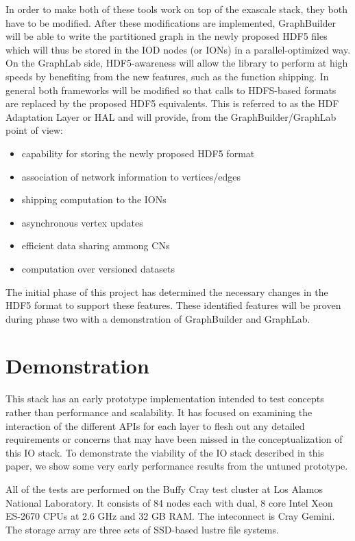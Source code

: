 \documentclass[conference]{IEEEtran}
\begin{document}
In order to make both of these tools work on top of the exascale stack, they
both have to be modified. After these modifications are implemented,
GraphBuilder will be able to write the partitioned graph in the newly proposed
HDF5 files which will thus be stored in the IOD nodes (or IONs) in a
parallel-optimized way. On the GraphLab side, HDF5-awareness will allow
the library to perform at high speeds by benefiting from the new
features, such as the function shipping. In general both frameworks will be
modified so that calls to HDFS-based formats are replaced by the proposed HDF5
equivalents. This is referred to as the HDF Adaptation Layer or HAL and will
provide, from the GraphBuilder/GraphLab point of view:

\begin{itemize}
\itemsep1pt\parskip0pt
\item
  capability for storing the newly proposed HDF5 format
\item
  association of network information to vertices/edges
\item
  shipping computation to the IONs
\item
  asynchronous vertex updates
\item
  efficient data sharing ammong CNs
\item
  computation over versioned datasets
\end{itemize}

The initial phase of this project has determined the necessary changes in the
HDF5 format to support these features. These identified features will be
proven during phase two with a demonstration of GraphBuilder and GraphLab.

\section{Demonstration}
\label{sec:evaluation}

This stack has an early prototype implementation intended to test concepts
rather than performance and scalability. It has focused on examining the
interaction of the different APIs for each layer to flesh out any detailed
requirements or concerns that may have been missed in the conceptualization of
this IO stack. To demonstrate the viability of the IO stack described in this
paper, we show some very early performance results from the untuned prototype.

All of the tests are performed on the Buffy Cray test cluster at Los Alamos
National Laboratory. It consists of 84 nodes each with dual, 8 core Intel
Xeon ES-2670 CPUs at 2.6 GHz and 32 GB RAM. The inteconnect is Cray Gemini.
The storage array are three sets of SSD-based lustre file systems.
\end{document}
